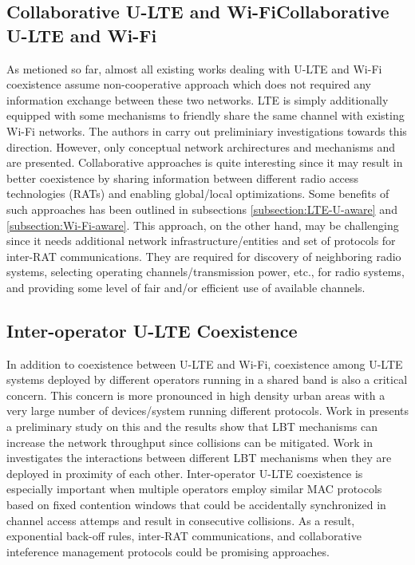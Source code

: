\documentclass[journal,draftclsnofoot,12pt,onecolumn]{IEEEtran}
\begin{document}
\subsection{Collaborative U-LTE and Wi-FiCollaborative U-LTE and Wi-Fi}

As metioned so far, almost all existing works dealing with U-LTE and Wi-Fi coexistence assume non-cooperative approach which does not required any information exchange between these two networks. LTE is simply additionally equipped with some mechanisms to friendly share the same channel with existing Wi-Fi networks. The authors in \cite{U-LTE-5G-2015, Coordinated-LTE-U-Wi-Fi-2015} carry out preliminiary investigations towards this direction. However, only conceptual network archirectures and mechanisms and are presented. Collaborative approaches is quite interesting since it may result in better coexistence by sharing information between different radio access technologies (RATs) and enabling global/local optimizations. Some benefits of such approaches has been outlined in subsections \ref{subsection:LTE-U-aware} and \ref{subsection:Wi-Fi-aware}. This approach, on the other hand, may be challenging since it needs additional network infrastructure/entities and set of protocols for inter-RAT communications. They are required for discovery of neighboring radio systems, selecting operating channels/transmission power, etc., for radio systems, and providing some level of fair and/or efficient use of available channels. 


\subsection{Inter-operator U-LTE Coexistence}

In addition to coexistence between U-LTE and Wi-Fi, coexistence among U-LTE systems deployed by different operators running in a shared band is also a critical concern. This concern is more pronounced in high density urban areas with a very large number of devices/system running different protocols. Work in \cite{LTE-U-ICC-WS-2015} presents a preliminary study on this and the results show that LBT mechanisms can increase the network throughput since collisions can be mitigated. Work in \cite{Enhanced-LTE-U-thesis-2015} investigates the interactions between different LBT mechanisms when they are deployed in proximity of each other. Inter-operator U-LTE coexistence is especially important when multiple operators employ similar MAC protocols based on fixed contention windows that could be accidentally synchronized in channel access attemps and result in consecutive collisions. As a result, exponential back-off rules, inter-RAT communications, and collaborative inteference management protocols could be promising approaches.
\end{document}
